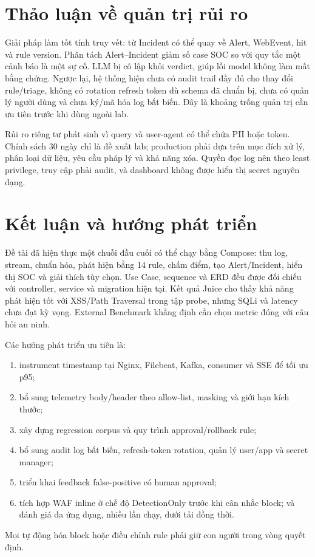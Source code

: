\documentclass[runningheads]{report-template/llncs}
\begin{document}
\section{Thảo luận về quản trị rủi ro}

Giải pháp làm tốt tính truy vết: từ Incident có thể quay về Alert,
WebEvent, hit và rule version. Phân tách Alert--Incident giảm số case SOC
so với quy tắc một cảnh báo là một sự cố. LLM bị cô lập khỏi verdict,
giúp lỗi model không làm mất bằng chứng. Ngược lại, hệ thống hiện chưa có
audit trail đầy đủ cho thay đổi rule/triage, không có rotation refresh
token dù schema đã chuẩn bị, chưa có quản lý người dùng và chưa ký/mã hóa
log bất biến. Đây là khoảng trống quản trị cần ưu tiên trước khi dùng
ngoài lab.

Rủi ro riêng tư phát sinh vì query và user-agent có thể chứa PII hoặc
token. Chính sách 30 ngày chỉ là đề xuất lab; production phải dựa trên
mục đích xử lý, phân loại dữ liệu, yêu cầu pháp lý và khả năng xóa. Quyền
đọc log nên theo least privilege, truy cập phải audit, và dashboard không
được hiển thị secret nguyên dạng.

\section{Kết luận và hướng phát triển}

Đề tài đã hiện thực một chuỗi đầu cuối có thể chạy bằng Compose: thu log,
stream, chuẩn hóa, phát hiện bằng 14 rule, chấm điểm, tạo Alert/Incident,
hiển thị SOC và giải thích tùy chọn. Use Case, sequence và ERD đều được
đối chiếu với controller, service và migration hiện tại. Kết quả Juice
cho thấy khả năng phát hiện tốt với XSS/Path Traversal trong tập probe,
nhưng SQLi và latency chưa đạt kỳ vọng. External Benchmark khẳng định
cần chọn metric đúng với câu hỏi an ninh.

Các hướng phát triển ưu tiên là:
\begin{enumerate}
  \item instrument timestamp tại Nginx, Filebeat, Kafka, consumer và SSE
  để tối ưu p95;
  \item bổ sung telemetry body/header theo allow-list, masking và giới
  hạn kích thước;
  \item xây dựng regression corpus và quy trình approval/rollback rule;
  \item bổ sung audit log bất biến, refresh-token rotation, quản lý
  user/app và secret manager;
  \item triển khai feedback false-positive có human approval;
  \item tích hợp WAF inline ở chế độ DetectionOnly trước khi cân nhắc
  block; và đánh giá đa ứng dụng, nhiều lần chạy, dưới tải đồng thời.
\end{enumerate}
Mọi tự động hóa block hoặc điều chỉnh rule phải giữ con người trong vòng
quyết định.
\end{document}
